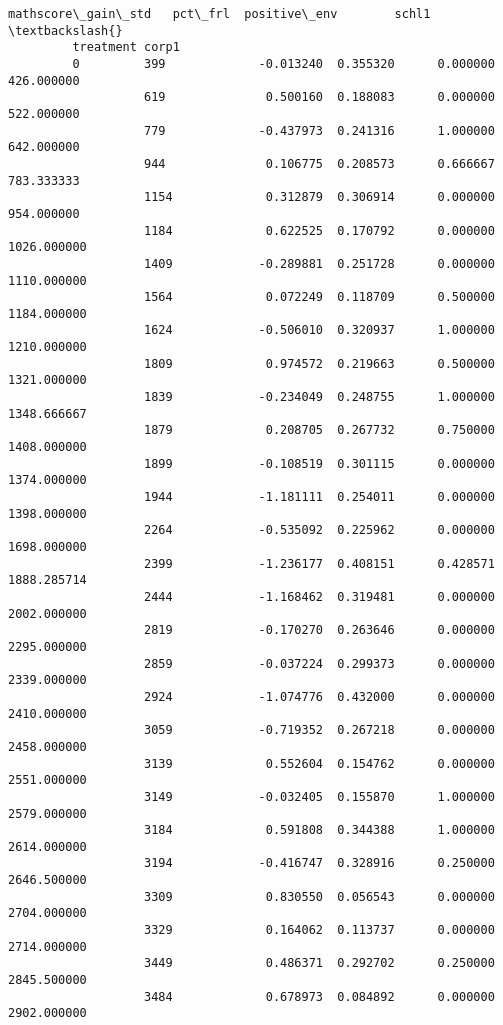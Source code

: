 \documentclass[11pt]{article}
\begin{document}
\begin{Verbatim}[commandchars=\\\{\}]
                          mathscore\_gain\_std   pct\_frl  positive\_env        schl1  \textbackslash{}
         treatment corp1                                                            
         0         399             -0.013240  0.355320      0.000000   426.000000   
                   619              0.500160  0.188083      0.000000   522.000000   
                   779             -0.437973  0.241316      1.000000   642.000000   
                   944              0.106775  0.208573      0.666667   783.333333   
                   1154             0.312879  0.306914      0.000000   954.000000   
                   1184             0.622525  0.170792      0.000000  1026.000000   
                   1409            -0.289881  0.251728      0.000000  1110.000000   
                   1564             0.072249  0.118709      0.500000  1184.000000   
                   1624            -0.506010  0.320937      1.000000  1210.000000   
                   1809             0.974572  0.219663      0.500000  1321.000000   
                   1839            -0.234049  0.248755      1.000000  1348.666667   
                   1879             0.208705  0.267732      0.750000  1408.000000   
                   1899            -0.108519  0.301115      0.000000  1374.000000   
                   1944            -1.181111  0.254011      0.000000  1398.000000   
                   2264            -0.535092  0.225962      0.000000  1698.000000   
                   2399            -1.236177  0.408151      0.428571  1888.285714   
                   2444            -1.168462  0.319481      0.000000  2002.000000   
                   2819            -0.170270  0.263646      0.000000  2295.000000   
                   2859            -0.037224  0.299373      0.000000  2339.000000   
                   2924            -1.074776  0.432000      0.000000  2410.000000   
                   3059            -0.719352  0.267218      0.000000  2458.000000   
                   3139             0.552604  0.154762      0.000000  2551.000000   
                   3149            -0.032405  0.155870      1.000000  2579.000000   
                   3184             0.591808  0.344388      1.000000  2614.000000   
                   3194            -0.416747  0.328916      0.250000  2646.500000   
                   3309             0.830550  0.056543      0.000000  2704.000000   
                   3329             0.164062  0.113737      0.000000  2714.000000   
                   3449             0.486371  0.292702      0.250000  2845.500000   
                   3484             0.678973  0.084892      0.000000  2902.000000   

\end{Verbatim}
\end{document}
